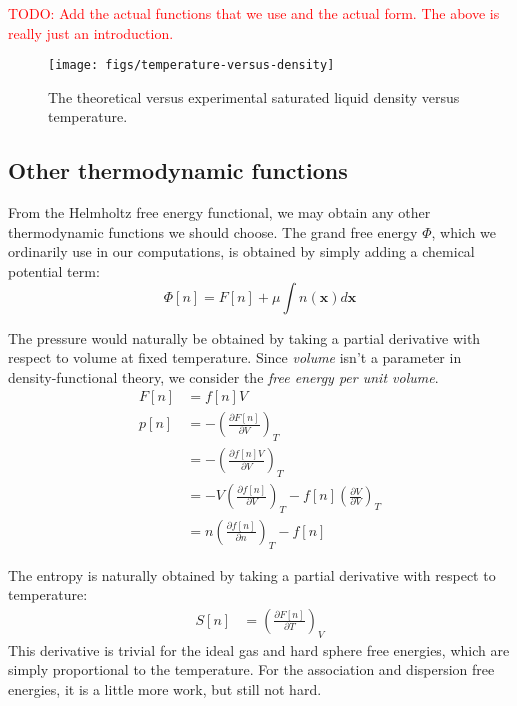 \documentclass[letterpaper,twocolumn,amsmath,amssymb,prb]{revtex4-1}
\newcommand{\xx}{\textbf{x}}
\begin{document}
\textcolor{red}{TODO:  Add the actual functions that we use and the
  actual form.  The above is really just an introduction.}


\begin{figure}
\begin{center}
\texttt{[image: figs/temperature-versus-density]}
\end{center}
\caption{The theoretical versus experimental saturated liquid density
  versus temperature.  }
\label{fig:saturated-liquid-density}
\end{figure}


\subsection{Other thermodynamic functions}

From the Helmholtz free energy functional, we may obtain any other
thermodynamic functions we should choose.  The grand free energy
$\Phi$, which we ordinarily use in our computations, is obtained by
simply adding a chemical potential term:
\begin{equation}
  \Phi[n] = F[n] + \mu \int n(\xx) d\xx
\end{equation}

The pressure would naturally be obtained by taking a partial
derivative with respect to volume at fixed temperature.  Since
\emph{volume} isn't a parameter in density-functional theory, we
consider the \emph{free energy per unit volume}.
\begin{align}
  F[n] &= f[n]V \\
  p[n] &= -\left(\frac{\partial F[n]}{\partial V}\right)_{T} \\
  &= -\left(\frac{\partial f[n]V}{\partial V}\right)_{T} \\
  &= -V\left(\frac{\partial f[n]}{\partial V}\right)_{T}
   - f[n]\left(\frac{\partial V}{\partial V}\right)_{T} \\
  &= n \left(\frac{\partial f[n]}{\partial n}\right)_{T} - f[n]
\end{align}

The entropy is naturally obtained by taking a partial derivative with
respect to temperature:
\begin{align}
  S[n] &= \left(\frac{\partial F[n]}{\partial T}\right)_{V}
\end{align}
This derivative is trivial for the ideal gas and hard sphere free
energies, which are simply proportional to the temperature.  For the
association and dispersion free energies, it is a little more work,
but still not hard.
\end{document}
